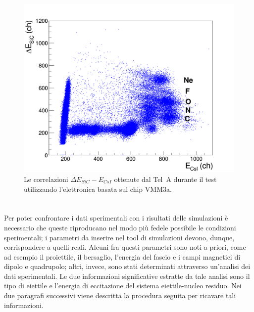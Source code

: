 \begin{figure} [!p]
	\centering
	\includegraphics[width=\textwidth, keepaspectratio]{Grafici_Tesi/Test/matrice_sic_csi_vmm3a.png}
	\caption{Le correlazioni $\Delta E_{SiC} - E_{CsI}$ ottenute dal Tel~A durante il test utilizzando l'elettronica basata sul chip VMM3a.} \label{fig:sic_csi_vmm3a}
\end{figure}

\section{}

Per poter confrontare i dati sperimentali con i risultati delle simulazioni è necessario che queste riproducano nel modo più fedele possibile le condizioni sperimentali; i parametri da inserire nel tool di simulazioni devono, dunque, corrispondere a quelli reali.
Alcuni fra questi parametri sono noti a priori, come ad esempio il proiettile, il bersaglio, l'energia del fascio e i campi magnetici di dipolo e quadrupolo; altri, invece, sono stati determinati attraverso un'analisi dei dati sperimentali.
Le due informazioni significative estratte da tale analisi sono il tipo di eiettile e l'energia di eccitazione del sistema eiettile-nucleo residuo.
Nei due paragrafi successivi viene descritta la procedura seguita per ricavare tali informazioni.

